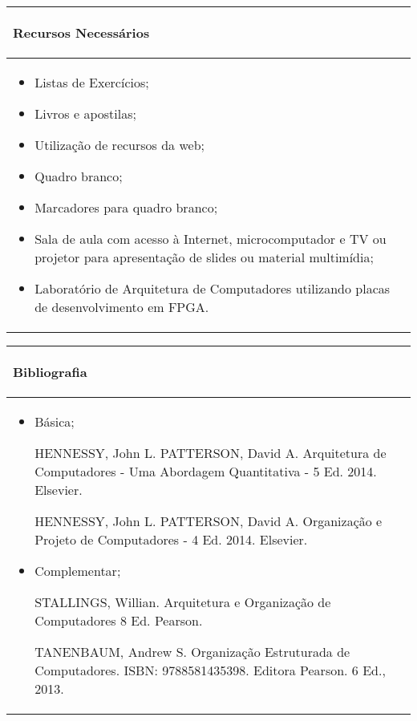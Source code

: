 \begin{table}[h]
\centering
\begin{small} 
 
\setlength{\tabcolsep}{3pt} 
\begin{tabular}{|p{15cm}|}\hline

\begin{center}\textbf{Recursos Necessários}\end{center}\\ \hline
\begin{itemize} 
  \item Listas de Exercícios;
  \item Livros e apostilas;
  \item Utilização de recursos da web;
  \item Quadro branco;
  \item Marcadores para quadro branco;
  \item Sala de aula com acesso à Internet, microcomputador e TV ou projetor para apresentação de slides ou material multimídia;
  \item Laboratório de Arquitetura de Computadores utilizando placas de desenvolvimento em FPGA.
\end{itemize}
 \\ \hline

\end{tabular} 
\end{small}
\label{dadosinstituicao}
\end{table}


\begin{table}[h]
\centering
\begin{small} 
\setlength{\tabcolsep}{3pt} 
\begin{tabular}{|p{15cm}|}\hline

\begin{center}\textbf{Bibliografia}\end{center}\\ \hline
\begin{itemize} 
  \item Básica;
  
  HENNESSY, John L. PATTERSON, David A. Arquitetura de Computadores - Uma Abordagem Quantitativa - 5 Ed. 2014. Elsevier.
  
  HENNESSY, John L. PATTERSON, David A. Organização e Projeto de Computadores - 4 Ed. 2014. Elsevier.
  
  \item Complementar;
  
  STALLINGS, Willian. Arquitetura e Organização de Computadores 8 Ed. Pearson.
   
  TANENBAUM, Andrew S. Organização Estruturada de Computadores. ISBN: 9788581435398. Editora Pearson. 6 Ed., 2013.

\end{itemize}
 \\ \hline

\end{tabular} 
\end{small}
\label{dadosinstituicao}
\end{table}
